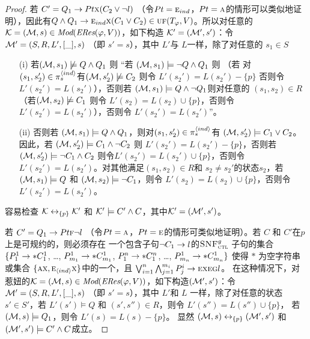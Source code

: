 \begin{proof}
	若 $C'= Q_1\rightarrow Pt \textsc{x} (C_2 \vee \neg l)$ （令$Pt=\textsc{e}_{ind}$，$Pt = \textsc{a}$的情形可以类似地证明），因此有$Q \wedge Q_1 \rightarrow \textsc{e}_{ind} \textsc{x}(C_1 \vee C_2) \in \textsc{uf}(T_\varphi,V)$。所以对任意的 ${\cal K}=({\cal M}, s)\in \textit{Mod}(\emph{ERes}(\varphi,V))$，如下构造 ${\cal K}'=({\cal M}',s')$：令${\cal M}'= (S, R, L', [\_], s)$ （即 $s'=s$），其中 $L'$与 $L$一样，除了对任意的 $s_1\in S$
	\begin{itemize}
		\item[(i)] 若$({\cal M}, s_1) \not \models Q \wedge Q_1$ 则 “若 $({\cal M}, s_1) \models \neg Q \wedge Q_1$ 则 （若 对 $(s_1, s_2') \in \pi_s^{{\langle{ind}\rangle}}$有$({\cal M}, s_2') \not \models C_2$  则令 $L'(s_2') = L(s_2') - \{p\}$ 否则令 $L'(s_2') = L(s_2')$），否则若 $({\cal M}, s_1) \models Q \wedge \neg Q_1$则对任意的 $(s_1, s_2) \in R$ （若$({\cal M}, s_2) \not \models C_1$ 则令 $L'(s_2) = L(s_2) \cup \{p\}$，否则令 $L'(s_2') = L(s_2')$），否则令 $L'(s_2') = L(s_2')$”。
		\item[(ii)] 否则若 $({\cal M}, s_1) \models Q \wedge Q_1$，则对$(s_1, s_2') \in \pi_s^{{\langle{ind}\rangle}}$有 $({\cal M},s_2') \models C_1 \vee C_2$。因此，若 $({\cal M}, s_2') \models C_1 \wedge \neg C_2$ 则 $L'(s_2') = L(s_2') - \{p\}$，否则若 $({\cal M}, s_2') \models \neg C_1 \wedge C_2$ 则令$L'(s_2') = L(s_2') \cup \{p\}$，否则令 $L'(s_2') = L(s_2')$。对其他满足$(s_1, s_2) \in R$和 $s_2 \not = s_2'$的状态$s_2$，若 $({\cal M}, s_1) \models Q$ 和 $({\cal M}, s_2) \models \neg C_1$，则令 $L'(s_2) = L(s_2) \cup \{p\}$，否则令 $L'(s_2') = L(s_2')$。
	\end{itemize}
	容易检查 ${\cal K} \leftrightarrow_{\{p\}} {\cal K}'$ 和 ${\cal K}' \models C' \wedge C$，其中${\cal K}' = ({\cal M}',s')$。
	
	若 $C' =  Q_1\rightarrow Pt \textsc{f} \neg l$ （令$Pt=\textsc{a}$，$Pt = \textsc{e}$的情形可类似地证明）。若 $C$ 和 $C'$在$p$上是可规约的，则必须存在 一个包含子句$\neg C_1 \rightarrow l$的${\textsc{SNF}_{\textsc{ctl}}^g}$ 子句的集合 $\{P_1^1 \rightarrow * C_1^1$, \dots, $P_{m_1}^1 \rightarrow * C_{m_1}^1$, $P_1^n \rightarrow * C_1^n$, \dots, $P_{m_n}^1 \rightarrow * C_{m_n}^1 \}$ 使得 $*$ 为空字符串或集合 $\{\textsc{a} \textsc{x}, \textsc{e}_{{\langle{ind}\rangle}} \textsc{x}\}$中的一个，且 $\bigvee_{i=1}^n \bigwedge_{j=1}^{m_i} P_j^i \rightarrow \textsc{e} \textsc{x} \textsc{e} \textsc{g} l$。
在这种情况下，对惹妞的${\cal K}=({\cal M}, s)\in \textit{Mod}(\emph{ERes}(\varphi,V))$，如下构造$({\cal M}',s')$：令${\cal M}'= (S, R, L', [\_],s)$ （即 $s'=s$），其中  $L'$和 $L$ 一样，除了对任意的状态 $s'\in S'$，若 $L'(s') \models Q$ 和 $(s',s'') \in R$，则令 $L'(s'') = L(s'') \cup \{p\}$， 若 $({\cal M},s)\models Q_1$，则令 $L'(s) = L(s) - \{p\}$。
	显然 $({\cal M}, s) \leftrightarrow_{\{p\}} ({\cal M}', s')$ 和 $({\cal M}',s') \models C' \wedge C$成立。	
	

\end{proof}
